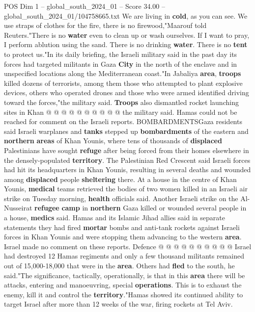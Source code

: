 \begin{textsample}{POS Dim 1 – global\_south\_2024\_01 – Score 34.00 – global\_south\_2024\_01/104758665.txt}
We are living in \textbf{cold}, as you can see.
We use straps of clothes for the fire, there is no firewood,"Maarouf told Reuters."There is no \textbf{water} even to clean up or wash ourselves.
If I want to pray, I perform ablution using the sand.
There is no drinking \textbf{water}.
There is no \textbf{tent} to protect us."In its daily briefing, the Israeli military said in the past day its forces had targeted militants in Gaza \textbf{City} in the north of the enclave and in unspecified locations along the Mediterranean coast."In Jabaliya \textbf{area}, \textbf{troops} killed dozens of terrorists, among them those who attempted to plant explosive devices, others who operated drones and those who were armed identified driving toward the forces,"the military said. \textbf{Troops} also dismantled rocket launching sites in Khan @ @ @ @ @ @ @ @ @ @ the military said.
Hamas could not be reached for comment on the Israeli reports.
BOMBARDMENTSGaza residents said Israeli warplanes and \textbf{tanks} stepped up \textbf{bombardments} of the eastern and \textbf{northern} \textbf{areas} of Khan Younis, where tens of thousands of \textbf{displaced} Palestinians have sought \textbf{refuge} after being forced from their homes elsewhere in the densely-populated \textbf{territory}.
The Palestinian Red Crescent said Israeli forces had hit its headquarters in Khan Younis, resulting in several deaths and wounded among \textbf{displaced} people \textbf{sheltering} there.
At a house in the centre of Khan Younis, \textbf{medical} teams retrieved the bodies of two women killed in an Israeli air strike on Tuesday morning, \textbf{health} officials said.
Another Israeli strike on the Al-Nusseirat \textbf{refugee} \textbf{camp} in \textbf{northern} Gaza killed or wounded several people in a house, \textbf{medics} said.
Hamas and its Islamic Jihad allies said in separate statements they had fired \textbf{mortar} bombs and anti-tank rockets against Israeli forces in Khan Younis and were stopping them advancing to the western \textbf{area}.
Israel made no comment on these reports.
Defence @ @ @ @ @ @ @ @ @ @ Israel had destroyed 12 Hamas regiments and only a few thousand militants remained out of 15,000-18,000 that were in the \textbf{area}.
Others had \textbf{fled} to the south, he said."The significance, tactically, operationally, is that in this \textbf{area} there will be attacks, entering and manoeuvring, special \textbf{operations}.
This is to exhaust the enemy, kill it and control the \textbf{territory}."Hamas showed its continued ability to target Israel after more than 12 weeks of the war, firing rockets at Tel Aviv.

\end{textsample}
